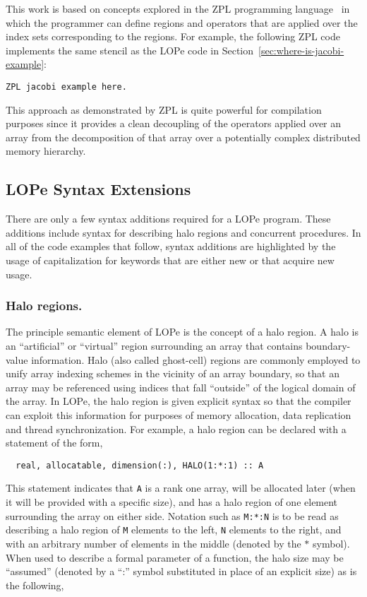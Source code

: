 This work is based on concepts explored in the ZPL programming
language~\cite{zpl1,zpl2} in which the programmer can define regions and 
operators that are applied over the index sets corresponding to the regions.
For example, the following ZPL code implements the same stencil as the
LOPe code in Section~\ref{sec:where-is-jacobi-example}:

\begin{verbatim}
ZPL jacobi example here.
\end{verbatim}
This approach as demonstrated by ZPL is quite powerful for compilation
purposes since it provides a clean decoupling of the operators applied
over an array from the decomposition of that array over a potentially
complex distributed memory hierarchy.  

\subsection{LOPe Syntax Extensions}

There are only a few syntax additions required for a LOPe program.
These additions include syntax for describing halo regions and
concurrent procedures.  In all of the code examples that follow,
syntax additions are highlighted by the usage of capitalization for
keywords that are either new or that acquire new usage.

\subsubsection{Halo regions.}
The principle semantic element of LOPe is the concept of a halo
region.  A halo is an ``artificial'' or ``virtual'' region surrounding
an array that contains boundary-value information.  Halo (also called
ghost-cell) regions are commonly employed to unify array indexing
schemes in the vicinity of an array boundary, so that an array may be
referenced using indices that fall ``outside'' of the logical domain
of the array.  In LOPe, the halo region is given explicit syntax so
that the compiler can exploit this information for purposes of memory
allocation, data replication and thread synchronization.  For example,
a halo region can be declared with a statement of the form,

\begin{verbatim}
  real, allocatable, dimension(:), HALO(1:*:1) :: A
\end{verbatim}
This statement indicates that \texttt{A} is a rank one array, will be
allocated later (when it will be provided with a specific size), and
has a halo region of one element surrounding the array on either side.
Notation such as \texttt{M:*:N} is to be read as describing a halo
region of \texttt{M} elements to the left, \texttt{N} elements to the
right, and with an arbitrary number of elements in the middle (denoted
by the $*$ symbol).  When used to describe a formal parameter of a
function, the halo size may be ``assumed'' (denoted by a ``:'' symbol
substituted in place of an explicit size) as is the following,

